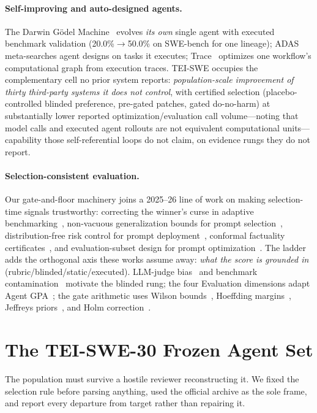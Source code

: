\documentclass[11pt]{article}
\begin{document}
\paragraph{Self-improving and auto-designed agents.}
The Darwin G\"odel Machine~\citep{dgm2025} evolves \emph{its own} single agent
with executed benchmark validation (20.0\%$\to$50.0\% on SWE-bench for one
lineage); ADAS~\citep{adas2024} meta-searches agent designs on tasks it
executes; Trace~\citep{trace2024} optimizes one workflow's computational graph
from execution traces. TEI-SWE occupies the complementary cell no prior system
reports: \emph{population-scale improvement of thirty third-party systems it
does not control}, with certified selection (placebo-controlled blinded
preference, pre-gated patches, gated do-no-harm) at substantially lower
reported optimization/evaluation call volume---noting that model calls and
executed agent rollouts are not equivalent computational units---capability
those self-referential loops do not claim, on evidence rungs they do not
report.

\paragraph{Selection-consistent evaluation.}
Our gate-and-floor machinery joins a 2025--26 line of work on making
selection-time signals trustworthy: correcting the winner's curse in adaptive
benchmarking~\citep{winnerscurse2026}, non-vacuous generalization bounds for
prompt selection~\citep{pacbayes2025}, distribution-free risk control for
prompt deployment~\citep{zollo2024}, conformal factuality
certificates~\citep{cfc2026}, and evaluation-subset design for prompt
optimization~\citep{sess2026}. The ladder adds the orthogonal axis these
works assume away: \emph{what the score is grounded in}
(rubric/blinded/static/executed). LLM-judge bias~\citep{llmjudge2023,
selfpreference2024} and benchmark contamination~\citep{contamination2023}
motivate the blinded rung; the four Evaluation dimensions adapt Agent
GPA~\citep{gpa2025}; the gate arithmetic uses Wilson bounds~\citep{wilson1927},
Hoeffding margins~\citep{hoeffding1963}, Jeffreys priors~\citep{jeffreys1946},
and Holm correction~\citep{holm1979}.

\section{The TEI-SWE-30 Frozen Agent Set}
\label{sec:set}
The population must survive a hostile reviewer reconstructing it. We fixed the
selection rule before parsing anything, used the official archive as the sole
frame, and report every departure from target rather than repairing it.
\end{document}
